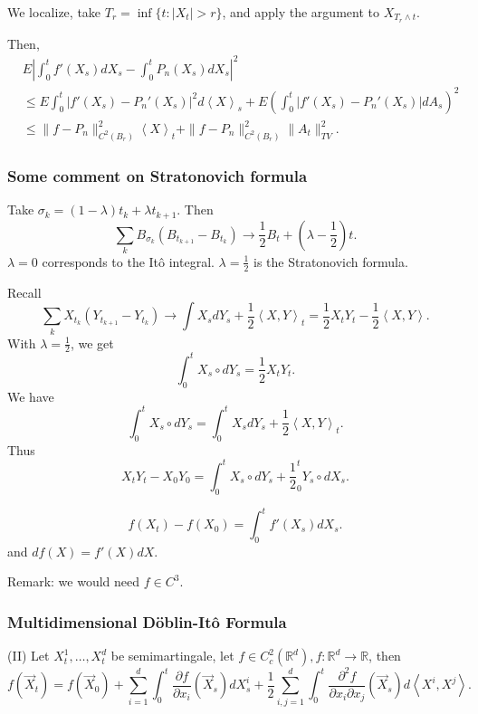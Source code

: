 We localize, take $T_r = \inf \{t: \left| X_t \right| > r\} $, and apply the argument to $X_{T_r \wedge t}$. 

Then, 
\begin{align*}
	&E\left| \int _0^t f'(X_s) d X_s - \int _0^t P_n(X_s) d X_s \right| ^2\\
	&\le  E \int _0^t \left| f'(X_s) - P_n'(X_s) \right| ^2 d \left\langle X \right\rangle _s
	+ E \left(\int _0^t \left| f'(X_s) - P_n'(X_s) \right| d A_s\right)^2\\
	&\le \|f - P_n\|_{C^2(B_r)}^2 \left\langle X \right\rangle _t + \|f - P_n\|_{C^2(B_r)}^2 \|A_t\|_{TV}^2
.\end{align*} 

\subsubsection{Some comment on Stratonovich formula}

Take $\sigma_k = (1 - \lambda) t_k + \lambda t_{k+1}$. Then
\[
	\sum_k B_{\sigma_k}\left( B_{t_{k+1}} - B_{t_k} \right) 
	\to  \frac{1}{2} B_t + \left( \lambda - \frac{1}{2} \right) t
.\] 
$\lambda = 0$ corresponds to the Itô integral. $\lambda = \frac{1}{2}$ is the Stratonovich formula.

Recall
\[
	\sum_k X_{t_k} \left( Y_{t_{k+1}} - Y_{t_k} \right) 
	\to  \int X_s d Y_s + \frac{1}{2} \left\langle X, Y \right\rangle _t
	= \frac{1}{2} X_t Y_t - \frac{1}{2} \left\langle X, Y \right\rangle 
.\] 
With $\lambda = \frac{1}{2}$, we get
\[
	\int _0^t X_s \circ d Y_s = \frac{1}{2} X_t Y_t
.\] 
We have
\[
	\int _0^t X_s \circ d Y_s 
	= \int _0^t X_s d Y_s + \frac{1}{2} \left\langle X, Y \right\rangle _t
.\] 
Thus
\[
	X_t Y_t - X_0 Y_0 = \int _0^t X_s \circ d Y_s + \frac{1}{2}_0^t Y_s \circ d X_s
.\] 

\begin{proposition}
	\[
		f(X_t) - f(X_0) = \int _0^t f'(X_s) d X_s
	.\] 
	and $d f(X) = f'(X)  d X$.
\end{proposition}
Remark: we would need $f \in C^3$.

\subsubsection{Multidimensional D\"oblin-Itô Formula}

\begin{theorem} (II)
	Let $X_t^1, \ldots, X_t^d$ be semimartingale, let $f \in C_c^2(\mathbb{R}^d), f : \mathbb{R}^d \to  \mathbb{R}$, then
	\[
		f(\vec{X} _t) = 
		f(\vec{X} _0) 
		+ \sum_{i=1}^{d} \int _0^t \frac{\partial f}{\partial x_i} (\vec{X} _s) d X_s^i
		+ \frac{1}{2}\sum_{i, j=1}^{d} \int _0^t \frac{\partial^2 f}{\partial x_i \partial x_j} (\vec{X} _s) d \left\langle X^i, X^j \right\rangle 
	.\] 
	
\end{theorem}

